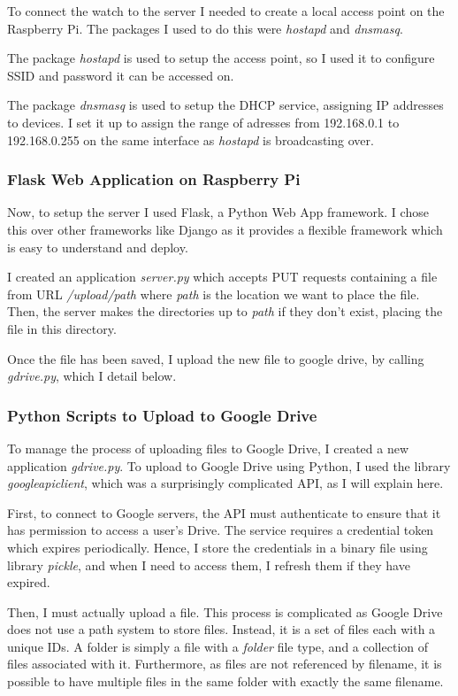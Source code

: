 \documentclass[12pt,a4paper,twoside,openright]{report}
\begin{document}
To connect the watch to the server I needed to create a local access point on the
Raspberry Pi. The
packages I used to do this were \emph{hostapd} and \emph{dnsmasq}. 

The package \emph{hostapd} is used to setup the access point, so I used it to configure
SSID and password it can be accessed on. 

The package \emph{dnsmasq} is used to setup the DHCP service, assigning IP
addresses to devices. I set it up to assign the range of adresses from 192.168.0.1 to
192.168.0.255 on the same interface as \emph{hostapd} is broadcasting over.

\subsubsection{Flask Web Application on Raspberry Pi}

Now, to setup the server I used Flask, a Python Web App framework. I chose
this over other frameworks like Django as it provides a flexible framework
which is easy to understand and deploy.

I created an application \emph{server.py} which
accepts PUT requests containing a file from URL \emph{/upload/path} where
\emph{path} is the location we want to place the file. Then, the server
makes the directories up to \emph{path} if they don't exist, placing the file
in this directory. 

Once the file has been saved, I upload the new file to google drive, by
calling \emph{gdrive.py}, which I detail below.

\subsubsection{Python Scripts to Upload to Google Drive}

To manage the process of uploading files to Google Drive, I created a new
application \emph{gdrive.py}. To upload to Google Drive using Python, I used
the library \emph{googleapiclient}, which was a surprisingly complicated API,
as I will explain here.

First, to connect to Google servers, the API must authenticate to ensure that
it has permission to access a user's Drive. The service requires a credential
token which expires periodically. Hence, I store the credentials in a binary
file using library \emph{pickle}, and when I need to access them, I 
refresh them if they have expired.

Then, I must actually upload a file. This process is complicated as Google
Drive does not use a path system to store files. Instead, it is a set of files
each with a unique IDs. A folder is simply a file with a \emph{folder} file
type, and a collection of files associated with it. Furthermore, as files are
not referenced by filename, it is possible to have multiple files in the same
folder with exactly the same filename.
\end{document}
